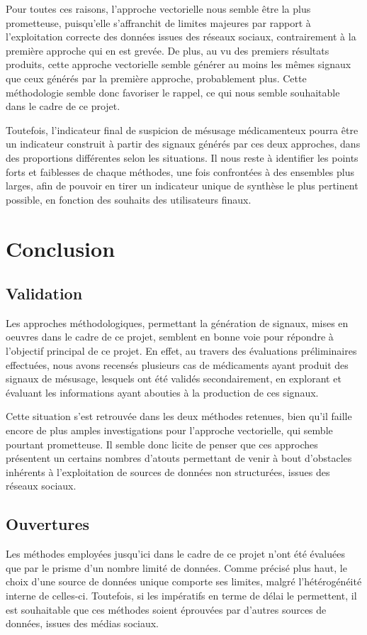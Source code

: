 \documentclass[a4paper, 12pt, openany, oneside, abstract=on]{article} %
\begin{document}
Pour toutes ces raisons, l'approche vectorielle nous semble être la plus prometteuse, puisqu'elle s'affranchit de limites majeures par rapport à l'exploitation correcte des données issues des réseaux sociaux, contrairement à la première approche qui en est grevée. De plus, au vu des premiers résultats produits, cette approche vectorielle semble générer au moins les mêmes signaux que ceux générés par la première approche, probablement plus. Cette méthodologie semble donc favoriser le rappel, ce qui nous semble souhaitable dans le cadre de ce projet.

Toutefois, l'indicateur final de suspicion de mésusage médicamenteux pourra être un indicateur construit à partir des signaux générés par ces deux approches, dans des proportions différentes selon les situations. Il nous reste à identifier les points forts et faiblesses de chaque méthodes, une fois confrontées à des ensembles plus larges, afin de pouvoir en tirer un indicateur unique de synthèse le plus pertinent possible, en fonction des souhaits des utilisateurs finaux.

\section{Conclusion}

\subsection{Validation}
Les approches méthodologiques, permettant la génération de signaux, mises en oeuvres dans le cadre de ce projet, semblent en bonne voie pour répondre à l'objectif principal de ce projet. En effet, au travers des évaluations préliminaires effectuées, nous avons recensés plusieurs cas de médicaments ayant produit des signaux de mésusage, lesquels ont été validés secondairement, en explorant et évaluant les informations ayant abouties à la production de ces signaux.

Cette situation s'est retrouvée dans les deux méthodes retenues, bien qu'il faille encore de plus amples investigations pour l'approche vectorielle, qui semble pourtant prometteuse. Il semble donc licite de penser que ces approches présentent un certains nombres d'atouts permettant de venir à bout d'obstacles inhérents à l'exploitation de sources de données non structurées, issues des réseaux sociaux.

\subsection{Ouvertures}
Les méthodes employées jusqu'ici dans le cadre de ce projet n'ont été évaluées que par le prisme d'un nombre limité de données. Comme précisé plus haut, le choix d'une source de données unique comporte ses limites, malgré l'hétérogénéité interne de celles-ci. Toutefois, si les impératifs en terme de délai le permettent, il est souhaitable que ces méthodes soient éprouvées par d'autres sources de données, issues des médias sociaux.
\end{document}
